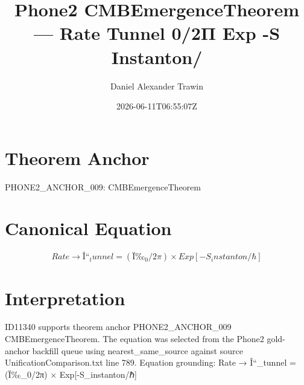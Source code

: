 \documentclass[11pt]{article}
\title{Phone2 CMBEmergenceTheorem — Rate Tunnel 0/2Π Exp -S Instanton/}
\author{Daniel Alexander Trawin}
\date{2026-06-11T06:55:07Z}
\begin{document}
\maketitle
\section*{Theorem Anchor}
PHONE2_ANCHOR_009: CMBEmergenceTheorem
\section*{Canonical Equation}
\[
Rate → Î“_tunnel = (Ï‰_0/2π) × Exp[-S_instanton/ℏ]
\]
\section*{Interpretation}
ID11340 supports theorem anchor PHONE2_ANCHOR_009 CMBEmergenceTheorem. The equation was selected from the Phone2 gold-anchor backfill queue using nearest_same_source against source UnificationComparison.txt line 789. Equation grounding: Rate → Î“_tunnel = (Ï‰_0/2π) × Exp[-S_instanton/ℏ]
\end{document}
